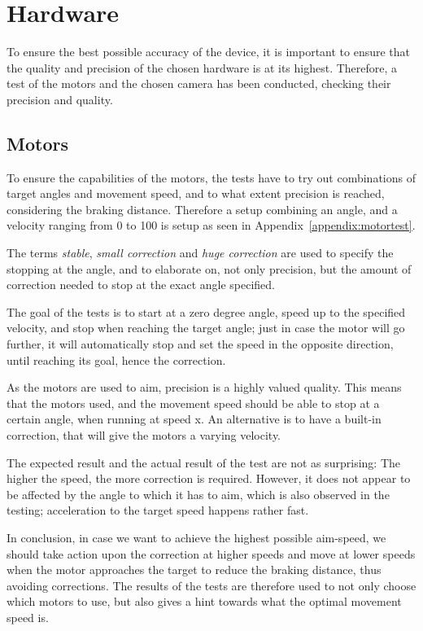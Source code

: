 \section{Hardware}\label{des:sec:hwtest}
To ensure the best possible accuracy of the device, it is important to ensure that the quality and precision of the chosen hardware is at its highest.
Therefore, a test of the motors and the chosen camera has been conducted, checking their precision and quality.

\subsection*{Motors}
To ensure the capabilities of the motors, the tests have to try out combinations of target angles and movement speed, and to what extent precision is reached, considering the braking distance.
Therefore a setup combining an angle, and a velocity ranging from 0 to 100 is setup as seen in Appendix~\ref{appendix:motortest}.

The terms \textit{stable}, \textit{small correction} and \textit{huge correction} are used to specify the stopping at the angle, and to elaborate on, not only precision, but the amount of correction needed to stop at the exact angle specified.

The goal of the tests is to start at a zero degree angle, speed up to the specified velocity, and stop when reaching the target angle; just in case the motor will go further, it will automatically stop and set the speed in the opposite direction, until reaching its goal, hence the correction.

As the motors are used to aim, precision is a highly valued quality.
This means that the motors used, and the movement speed should be able to stop at a certain angle, when running at speed x.
An alternative is to have a built-in correction, that will give the motors a varying velocity.

The expected result and the actual result of the test are not as surprising: The higher the speed, the more correction is required.
However, it does not appear to be affected by the angle to which it has to aim, which is also observed in the testing; acceleration to the target speed happens rather fast.

In conclusion, in case we want to achieve the highest possible aim-speed, we should take action upon the correction at higher speeds and move at lower speeds when the motor approaches the target to reduce the braking distance, thus avoiding corrections.
The results of the tests are therefore used to not only choose which motors to use, but also gives a hint towards what the optimal movement speed is.

